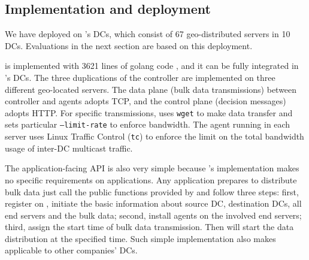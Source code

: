 \subsection{Implementation and deployment}
\label{sec:deployment}


We have deployed \name on \company's DCs, which consist of 67 geo-distributed servers in 10 DCs. Evaluations in the next section are based on this deployment. %

\name is implemented with 3621 lines of golang code \cite{golang}, and it can be fully integrated in \company's DCs. The three duplications of the controller are implemented on three different geo-located servers.
The data plane (bulk data transmissions) between controller and agents adopts TCP, and the control plane (decision messages) adopts HTTP. For specific transmissions, \name uses \texttt{wget} to make data transfer and sets particular \texttt{--limit-rate} to enforce bandwidth.
The agent running in each server uses Linux Traffic Control (\texttt{tc}) to enforce the limit on the total bandwidth usage of inter-DC multicast traffic.



The application-facing API is also very simple because \name's implementation makes no specific requirements on applications. Any application prepares to distribute bulk data just call the public functions provided by \name and follow three steps: first, register on \name, initiate the basic information about source DC, destination DCs, all end servers and the bulk data; second, install agents on the involved end servers; third, assign the start time of bulk data transmission. Then \name will start the data distribution at the specified time. Such simple implementation also makes \name applicable to other companies' DCs. 	


